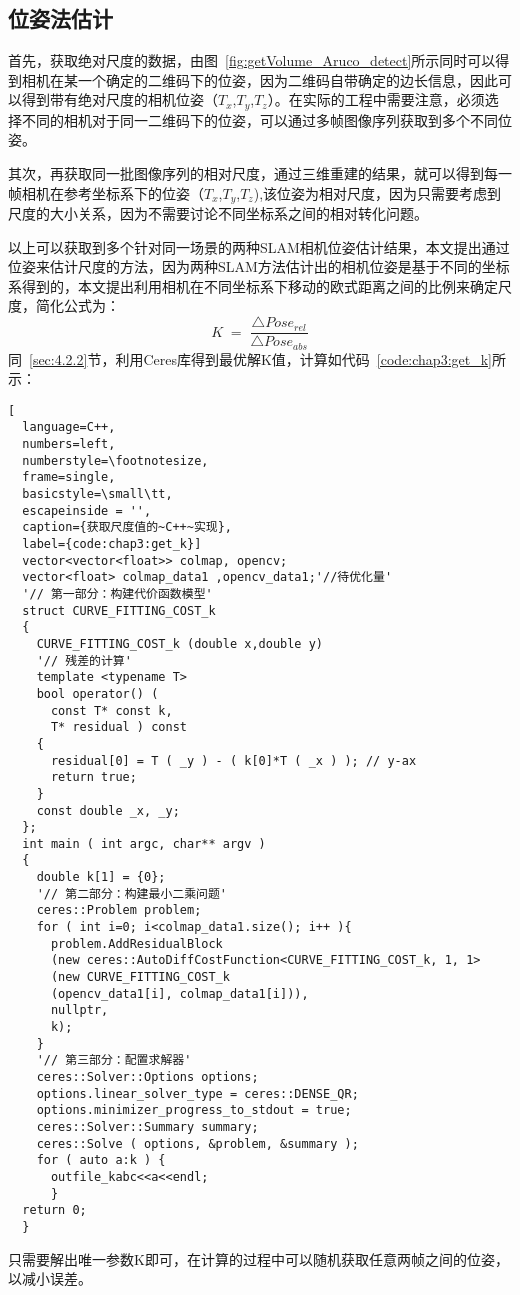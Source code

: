 \subsection{位姿法估计}
首先，获取绝对尺度的数据，由图~\ref{fig:getVolume_Aruco_detect}所示同时可以得到相机在某一个确定的二维码下的位姿，因为二维码自带确定的边长信息，因此可以得到带有绝对尺度的相机位姿（$T_x$,$T_y$,$T_z$）。在实际的工程中需要注意，必须选择不同的相机对于同一二维码下的位姿，可以通过多帧图像序列获取到多个不同位姿。

其次，再获取同一批图像序列的相对尺度，通过三维重建的结果，就可以得到每一帧相机在参考坐标系下的位姿（$T_x$,$T_y$,$T_z$),该位姿为相对尺度，因为只需要考虑到尺度的大小关系，因为不需要讨论不同坐标系之间的相对转化问题。

以上可以获取到多个针对同一场景的两种SLAM相机位姿估计结果，本文提出通过位姿来估计尺度的方法，因为两种SLAM方法估计出的相机位姿是基于不同的坐标系得到的，本文提出利用相机在不同坐标系下移动的欧式距离之间的比例来确定尺度，简化公式为：
\begin{equation}K\;=\;\frac{\triangle Pose_{rel}}{\triangle Pose_{abs}}  
\label{equ:getVolume_K}\end{equation}
同~\ref{sec:4.2.2}节，利用Ceres库得到最优解K值，计算如代码~\ref{code:chap3:get_k}所示：
\begin{lstlisting}[
  language=C++,
  numbers=left,                
  numberstyle=\footnotesize,
  frame=single,     
  basicstyle=\small\tt,    
  escapeinside = '',
  caption={获取尺度值的~C++~实现},
  label={code:chap3:get_k}]
  vector<vector<float>> colmap, opencv;
  vector<float> colmap_data1 ,opencv_data1;'//待优化量'
  '// 第一部分：构建代价函数模型'
  struct CURVE_FITTING_COST_k
  {
    CURVE_FITTING_COST_k (double x,double y)
    '// 残差的计算'
    template <typename T>
    bool operator() (
      const T* const k,     
      T* residual ) const     
    {
      residual[0] = T ( _y ) - ( k[0]*T ( _x ) ); // y-ax
      return true;
    }
    const double _x, _y;
  };
  int main ( int argc, char** argv )
  {   
    double k[1] = {0};
    '// 第二部分：构建最小二乘问题'
    ceres::Problem problem;
    for ( int i=0; i<colmap_data1.size(); i++ ){
      problem.AddResidualBlock 
      (new ceres::AutoDiffCostFunction<CURVE_FITTING_COST_k, 1, 1>
      (new CURVE_FITTING_COST_k 
      (opencv_data1[i], colmap_data1[i])),
      nullptr,
      k);
    }
    '// 第三部分：配置求解器'
    ceres::Solver::Options options;   
    options.linear_solver_type = ceres::DENSE_QR;  
    options.minimizer_progress_to_stdout = true;  
    ceres::Solver::Summary summary;              
    ceres::Solve ( options, &problem, &summary );  
    for ( auto a:k ) {
      outfile_kabc<<a<<endl;
      }
  return 0;
  }
\end{lstlisting}
只需要解出唯一参数K即可，在计算的过程中可以随机获取任意两帧之间的位姿，以减小误差。

